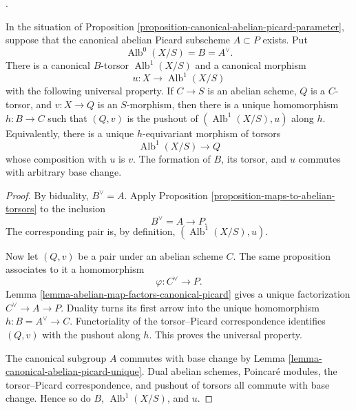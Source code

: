 \begin{theorem}
\label{theorem-relative-albanese-torsor}
\begin{reference}
\cite[Expos\'e 236, Theorem 3.3(iii), pp. 237--238]{FGA}.
\end{reference}
In the situation of Proposition
\ref{proposition-canonical-abelian-picard-parameter}, suppose that the
canonical abelian Picard subscheme $A \subset P$ exists. Put
$$
\operatorname{Alb}^0(X/S) = B = A^\vee.
$$
There is a canonical $B$-torsor $\operatorname{Alb}^1(X/S)$ and a canonical
morphism
$$
u : X \longrightarrow \operatorname{Alb}^1(X/S)
$$
with the following universal property. If $C \to S$ is an abelian scheme,
$Q$ is a $C$-torsor, and $v : X \to Q$ is an $S$-morphism, then there is a
unique homomorphism $h : B \to C$ such that $(Q, v)$ is the pushout of
$(\operatorname{Alb}^1(X/S), u)$ along $h$. Equivalently, there is a unique
$h$-equivariant morphism of torsors
$$
\operatorname{Alb}^1(X/S) \longrightarrow Q
$$
whose composition with $u$ is $v$. The formation of $B$, its torsor, and $u$
commutes with arbitrary base change.
\end{theorem}

\begin{proof}
By biduality, $B^\vee = A$. Apply Proposition
\ref{proposition-maps-to-abelian-torsors} to the inclusion
$$
B^\vee = A \longrightarrow P.
$$
The corresponding pair is, by definition,
$(\operatorname{Alb}^1(X/S), u)$.

Now let $(Q, v)$ be a pair under an abelian scheme $C$. The same proposition
associates to it a homomorphism
$$
\varphi : C^\vee \longrightarrow P.
$$
Lemma \ref{lemma-abelian-map-factors-canonical-picard} gives a unique
factorization $C^\vee \to A \to P$. Duality turns its first arrow into the
unique homomorphism $h : B = A^\vee \to C$. Functoriality of the
torsor--Picard correspondence identifies $(Q, v)$ with the pushout along $h$.
This proves the universal property.

The canonical subgroup $A$ commutes with base change by Lemma
\ref{lemma-canonical-abelian-picard-unique}. Dual abelian schemes, Poincar\'e
modules, the torsor--Picard correspondence, and pushout of torsors all commute
with base change. Hence so do $B$, $\operatorname{Alb}^1(X/S)$, and $u$.
\end{proof}

